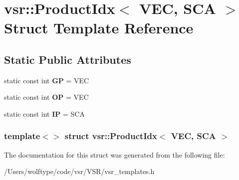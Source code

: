 \hypertarget{structvsr_1_1_product_idx_3_01_v_e_c_00_01_s_c_a_01_4}{\section{vsr\-:\-:Product\-Idx$<$ V\-E\-C, S\-C\-A $>$ Struct Template Reference}
\label{structvsr_1_1_product_idx_3_01_v_e_c_00_01_s_c_a_01_4}
}
\subsection*{Static Public Attributes}
\begin{DoxyCompactItemize}
\item 
\hypertarget{structvsr_1_1_product_idx_3_01_v_e_c_00_01_s_c_a_01_4_ac280ebfc921f9f4dbd0e5470949b7cd9}{static const int {\bfseries G\-P} = V\-E\-C}\label{structvsr_1_1_product_idx_3_01_v_e_c_00_01_s_c_a_01_4_ac280ebfc921f9f4dbd0e5470949b7cd9}

\item 
\hypertarget{structvsr_1_1_product_idx_3_01_v_e_c_00_01_s_c_a_01_4_ae8763c3f1f2f5bb0936913a0881486db}{static const int {\bfseries O\-P} = V\-E\-C}\label{structvsr_1_1_product_idx_3_01_v_e_c_00_01_s_c_a_01_4_ae8763c3f1f2f5bb0936913a0881486db}

\item 
\hypertarget{structvsr_1_1_product_idx_3_01_v_e_c_00_01_s_c_a_01_4_a04a37c678d6f4418b193ff0e3cdcae27}{static const int {\bfseries I\-P} = S\-C\-A}\label{structvsr_1_1_product_idx_3_01_v_e_c_00_01_s_c_a_01_4_a04a37c678d6f4418b193ff0e3cdcae27}

\end{DoxyCompactItemize}
\subsubsection*{template$<$$>$ struct vsr\-::\-Product\-Idx$<$ V\-E\-C, S\-C\-A $>$}



The documentation for this struct was generated from the following file\-:\begin{DoxyCompactItemize}
\item 
/\-Users/wolftype/code/vsr/\-V\-S\-R/vsr\-\_\-templates.\-h\end{DoxyCompactItemize}

